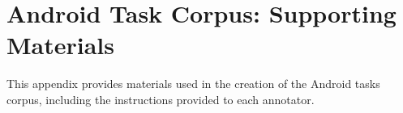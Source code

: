 \chapter{Android Task Corpus: Supporting Materials}


This appendix provides materials used in the creation of the Android tasks corpus, including the 
 instructions provided to each annotator.